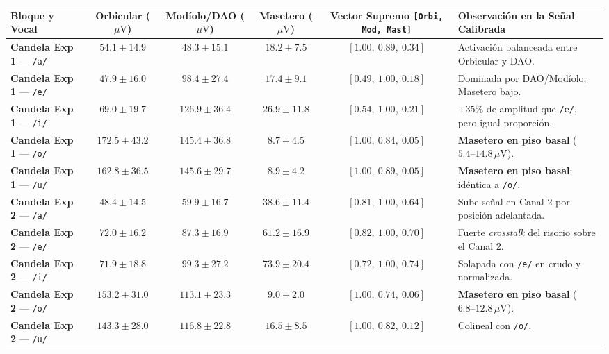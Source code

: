 \documentclass[11pt, a4paper]{article}
\begin{document}
\begin{table}[H]
\centering
\scriptsize
\begin{tabularx}{\textwidth}{l c c c c X}
\toprule
\textbf{Bloque y Vocal} & \textbf{Orbicular ($\mu\text{V}$)} & \textbf{Modíolo/DAO ($\mu\text{V}$)} & \textbf{Masetero ($\mu\text{V}$)} & \textbf{Vector Supremo \texttt{[Orbi, Mod, Mast]}} & \textbf{Observación en la Señal Calibrada} \\
\midrule
\textbf{Candela Exp 1} --- \texttt{/a/} & $54.1 \pm 14.9$ & $48.3 \pm 15.1$ & $18.2 \pm 7.5$  & $\mathbf{[1.00,\ 0.89,\ 0.34]}$ & Activación balanceada entre Orbicular y DAO. \\
\textbf{Candela Exp 1} --- \texttt{/e/} & $47.9 \pm 16.0$ & $98.4 \pm 27.4$ & $17.4 \pm 9.1$  & $\mathbf{[0.49,\ 1.00,\ 0.18]}$ & Dominada por DAO/Modíolo; Masetero bajo. \\
\textbf{Candela Exp 1} --- \texttt{/i/} & $69.0 \pm 19.7$ & $126.9 \pm 36.4$& $26.9 \pm 11.8$ & $\mathbf{[0.54,\ 1.00,\ 0.21]}$ & $+35\%$ de amplitud que \texttt{/e/}, pero igual proporción. \\
\textbf{Candela Exp 1} --- \texttt{/o/} & $172.5 \pm 43.2$& $145.4 \pm 36.8$& $\mathbf{8.7 \pm 4.5}$   & $\mathbf{[1.00,\ 0.84,\ 0.05]}$ & \textbf{Masetero en piso basal} ($5.4\text{--}14.8\,\mu\text{V}$). \\
\textbf{Candela Exp 1} --- \texttt{/u/} & $162.8 \pm 36.5$& $145.6 \pm 29.7$& $\mathbf{8.9 \pm 4.2}$   & $\mathbf{[1.00,\ 0.89,\ 0.05]}$ & \textbf{Masetero en piso basal}; idéntica a \texttt{/o/}. \\
\midrule
\textbf{Candela Exp 2} --- \texttt{/a/} & $48.4 \pm 14.5$ & $59.9 \pm 16.7$ & $38.6 \pm 11.4$ & $\mathbf{[0.81,\ 1.00,\ 0.64]}$ & Sube señal en Canal 2 por posición adelantada. \\
\textbf{Candela Exp 2} --- \texttt{/e/} & $72.0 \pm 16.2$ & $87.3 \pm 16.9$ & $\mathbf{61.2 \pm 16.9}$ & $\mathbf{[0.82,\ 1.00,\ 0.70]}$ & Fuerte \textit{crosstalk} del risorio sobre el Canal 2. \\
\textbf{Candela Exp 2} --- \texttt{/i/} & $71.9 \pm 18.8$ & $99.3 \pm 27.2$ & $\mathbf{73.9 \pm 20.4}$ & $\mathbf{[0.72,\ 1.00,\ 0.74]}$ & Solapada con \texttt{/e/} en crudo y normalizada. \\
\textbf{Candela Exp 2} --- \texttt{/o/} & $153.2 \pm 31.0$& $113.1 \pm 23.3$& $\mathbf{9.0 \pm 2.0}$   & $\mathbf{[1.00,\ 0.74,\ 0.06]}$ & \textbf{Masetero en piso basal} ($6.8\text{--}12.8\,\mu\text{V}$). \\
\textbf{Candela Exp 2} --- \texttt{/u/} & $143.3 \pm 28.0$& $116.8 \pm 22.8$& $16.5 \pm 8.5$  & $\mathbf{[1.00,\ 0.82,\ 0.12]}$ & Colineal con \texttt{/o/}. \\

\end{tabularx}
\end{table}
\end{document}
